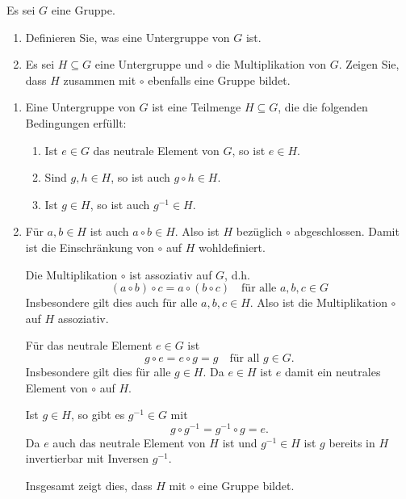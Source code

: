 \begin{question}
 Es sei $G$ eine Gruppe.
 \begin{enumerate}
  \item
   Definieren Sie, was eine Untergruppe von $G$ ist.
  \item
   Es sei $H \subseteq G$ eine Untergruppe und $\circ$ die Multiplikation von $G$. Zeigen Sie, dass $H$ zusammen mit $\circ$ ebenfalls eine Gruppe bildet.
 \end{enumerate}
\end{question}
\begin{solution}
 \begin{enumerate}
  \item
   Eine Untergruppe von $G$ ist eine Teilmenge $H \subseteq G$, die die folgenden Bedingungen erfüllt:
   \begin{enumerate}
    \item
     Ist $e \in G$ das neutrale Element von $G$, so ist $e \in H$.
    \item
     Sind $g, h \in H$, so ist auch $g \circ h \in H$.
    \item
     Ist $g \in H$, so ist auch $g^{-1} \in H$.
   \end{enumerate}
  \item
   Für $a, b \in H$ ist auch $a \circ b \in H$. Also ist $H$ bezüglich $\circ$ abgeschlossen. Damit ist die Einschränkung von $\circ$ auf $H$ wohldefiniert.
   
   Die Multiplikation $\circ$ ist assoziativ auf $G$, d.h.
   \[
    (a \circ b) \circ c = a \circ (b \circ c)
    \quad \text{für alle $a,b,c \in G$}
   \]
   Insbesondere gilt dies auch für alle $a,b,c \in H$. Also ist die Multiplikation $\circ$ auf $H$ assoziativ.
   
   Für das neutrale Element $e \in G$ ist
   \[
    g \circ e = e \circ g = g \quad \text{für all $g \in G$}.
   \]
   Insbesondere gilt dies für alle $g \in H$. Da $e \in H$ ist $e$ damit ein neutrales Element von $\circ$ auf $H$.
   
   Ist $g \in H$, so gibt es $g^{-1} \in G$ mit
   \[
    g \circ g^{-1} = g^{-1} \circ g = e.
   \]
   Da $e$ auch das neutrale Element von $H$ ist und $g^{-1} \in H$ ist $g$ bereits in $H$ invertierbar mit Inversen $g^{-1}$.
   
   Insgesamt zeigt dies, dass $H$ mit $\circ$ eine Gruppe bildet.
 \end{enumerate}
\end{solution}


